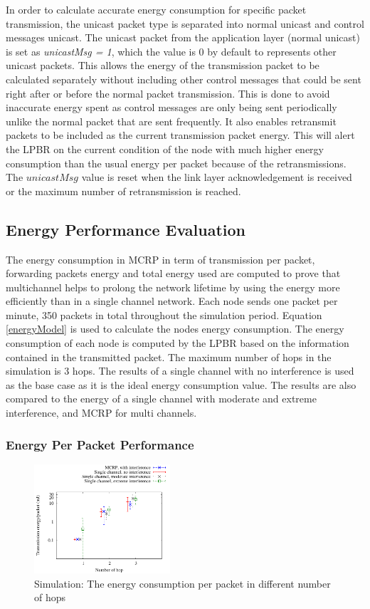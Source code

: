 In order to calculate accurate energy consumption for specific packet transmission, the unicast packet type is separated into normal unicast and control messages unicast. The unicast packet from the application layer (normal unicast) is set as \textit{unicastMsg = 1}, which the value is 0 by default to represents other unicast packets. This allows the energy of the transmission packet to be calculated separately without including other control messages that could be sent right after or before the normal packet transmission. This is done to avoid inaccurate energy spent as control messages are only being sent periodically unlike the normal packet that are sent frequently. It also enables retransmit packets to be included as the current transmission packet energy. This will alert the LPBR on the current condition of the node with much higher energy consumption than the usual energy per packet because of the retransmissions. The $unicastMsg$ value is reset when the link layer acknowledgement is received or the maximum number of retransmission is reached. 

\subsection{Energy Performance Evaluation}
 
The energy consumption in MCRP in term of transmission per packet, forwarding packets energy and total energy used are computed to prove that multichannel helps to prolong the network lifetime by using the energy more efficiently than in a single channel network. Each node sends one packet per minute, 350 packets in total throughout the simulation period. Equation \ref{energyModel} is used to calculate the nodes energy consumption. The energy consumption of each node is computed by the LPBR based on the information contained in the transmitted packet. The maximum number of hops in the simulation is 3 hops. The results of a single channel with no interference is used as the base case as it is the ideal energy consumption value. The results are also compared to the energy of a single channel with moderate and extreme interference, and MCRP for multi channels.

\subsubsection{Energy Per Packet Performance}

\begin{figure}
\centering
\includegraphics[width=0.45\textwidth]{figures/perPktEnergy.pdf}
\caption{Simulation: The energy consumption per packet in different number of hops}
\label{fig:energyPerPkt}
\end{figure}

